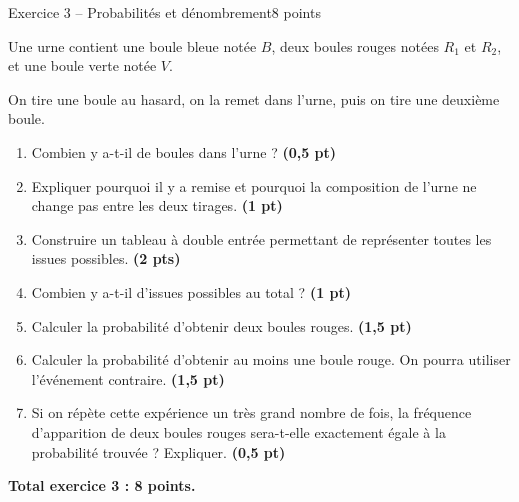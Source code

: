 \documentclass[11pt,a4paper]{article}
\newcommand{\pts}[1]{\hfill \textbf{(#1 pt)}}
\newcommand{\ptss}[1]{\hfill \textbf{(#1 pts)}}
\begin{document}
\begin{exercicebox}{Exercice 3 -- Probabilités et dénombrement}{8 points}

Une urne contient une boule bleue notée $B$, deux boules rouges notées $R_1$ et $R_2$, et une boule verte notée $V$.

On tire une boule au hasard, on la remet dans l’urne, puis on tire une deuxième boule.

\begin{enumerate}
    \item Combien y a-t-il de boules dans l’urne ? \pts{0,5}

    \item Expliquer pourquoi il y a remise et pourquoi la composition de l’urne ne change pas entre les deux tirages. \pts{1}

    \item Construire un tableau à double entrée permettant de représenter toutes les issues possibles. \ptss{2}

    \item Combien y a-t-il d’issues possibles au total ? \pts{1}

    \item Calculer la probabilité d’obtenir deux boules rouges. \pts{1,5}

    \item Calculer la probabilité d’obtenir au moins une boule rouge. On pourra utiliser l’événement contraire. \pts{1,5}

    \item Si on répète cette expérience un très grand nombre de fois, la fréquence d’apparition de deux boules rouges sera-t-elle exactement égale à la probabilité trouvée ? Expliquer. \pts{0,5}
\end{enumerate}

\textbf{Total exercice 3 : 8 points.}

\end{exercicebox}
\end{document}
